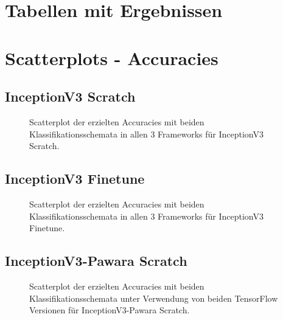 \makeatletter
\let\savedchap\@makechapterhead
\def\@makechapterhead{\vspace*{-2cm}\savedchap}
\makeatletter
\let\clearpage\relax
\let\cleardoublepage\relax
\chapter{Tabellen mit Ergebnissen}
\label{ch:Anhang_Tabellen}
%
\null\newpage%
\chapter{Scatterplots - Accuracies}
\label{ch:Anhang_ScatterplotsAccuracies}
\section{InceptionV3 Scratch}
\begin{figure}[H]
\hspace*{-1.5cm}

\caption{Scatterplot der erzielten Accuracies mit beiden Klassifikationsschemata in allen 3 Frameworks für InceptionV3 Scratch.}
\label{fig:ScatterplotIS}
\end{figure}%
\newpage%
\section{InceptionV3 Finetune}
\begin{figure}[H]
\hspace*{-1.5cm}

\caption{Scatterplot der erzielten Accuracies mit beiden Klassifikationsschemata in allen 3 Frameworks für InceptionV3 Finetune.}
\label{fig:ScatterplotIF}
\end{figure}%
\newpage%
\section{InceptionV3-Pawara Scratch}
\begin{figure}[H]
\hspace*{-1.5cm}

\caption{Scatterplot der erzielten Accuracies mit beiden Klassifikationsschemata unter Verwendung von beiden TensorFlow \cite{tensorflow} Versionen für InceptionV3-Pawara Scratch.}
\label{fig:ScatterplotIPS}
\end{figure}%
\newpage%
